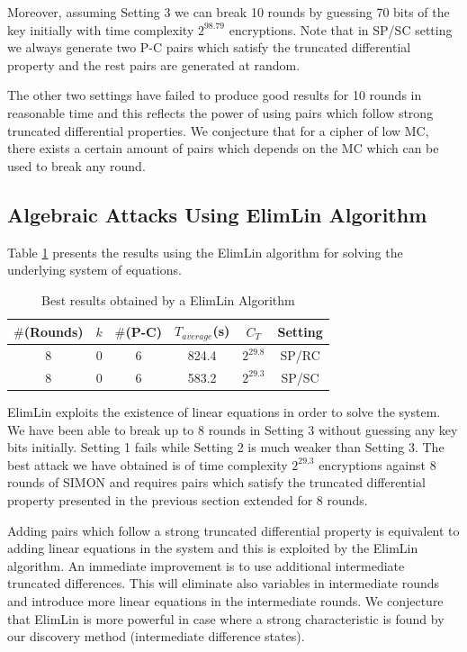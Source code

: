 Moreover, assuming Setting 3 we can break 10 rounds by
guessing 70 bits of the key initially with time complexity $2^{98.79}$ encryptions.
Note that in SP/SC setting we always generate two P-C pairs which satisfy the truncated differential property and the rest pairs are generated at random.

The other two settings have failed to produce good results for 10 rounds in reasonable time
and this reflects the power of using pairs which follow strong truncated differential properties. We conjecture that for a cipher of low MC, there exists a certain amount of pairs which depends on the MC which can be used to break any round.

\subsection{Algebraic Attacks Using ElimLin Algorithm}

Table \ref{tab:SimonElimlin} presents the results using the ElimLin algorithm for solving the
underlying system of equations.


\begin{table}[!h]
\caption{Best results obtained by a ElimLin Algorithm}\label{tab:SimonElimlin} \centering
\begin{tabular}{|c|c|c|c|c|c|}
  \hline
  $\#$(Rounds) & $k$ & $\#$(P-C) & $T_{average}$(s) & $C_T$ & Setting \\
  \hline
  8 & 0 & 6 & 824.4 & $2^{29.8}$ & SP/RC \\
 \hline
 8 & 0 & 6 & 583.2 & $2^{29.3}$ & SP/SC \\
  \hline
\end{tabular}
\end{table}

ElimLin exploits the existence of linear equations in order to solve the system. We have been able to break up to 8 rounds in Setting 3 without guessing any key bits
initially. Setting 1 fails while Setting 2 is much weaker than Setting 3. The best
attack we have obtained is of time complexity $2^{29.3}$ encryptions against 8 rounds of SIMON and requires pairs which satisfy
the truncated differential property presented in the previous section extended for 8 rounds.

Adding pairs which follow a strong truncated differential property is equivalent to adding linear equations in the system and this
is exploited by the ElimLin algorithm. An immediate improvement is to use additional intermediate truncated differences.
This will eliminate also variables in intermediate rounds and introduce more linear
equations in the intermediate rounds. We conjecture that ElimLin is more powerful
in case where a strong characteristic is found by our discovery method (intermediate difference states).


